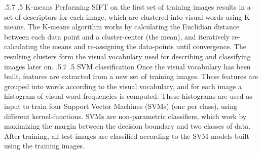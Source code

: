 \documentclass[12pt,a4paper]{amsart}
\makeatletter
\def\subsection{\@startsection{subsection}{2}{\z@}%
  {.5\linespacing\@plus.7\linespacing}%
  {.5\linespacing}%
  {\small\normalfont}}
\makeatother
\begin{document}
\subsection{K-means}
Performing SIFT on the first set of training images results in a set of descriptors for each image, which are clustered into visual words using K-means. The K-means algorithm works by calculating the Euclidian distance between each data point and a cluster-center (the mean), and iteratively re-calculating the means and re-assigning the data-points until convergence. The resulting clusters form the visual vocabulary used for describing and classifying images later on. 
\subsection{SVM classification}
Once the visual vocabulary has been built, features are extracted from a new set of training images. These features are grouped into words according to the visual vocabulary, and for each image a histogram of visual word frequencies is computed.
These histograms are used as input to train four Support Vector Machines (SVMs) (one per class), using different kernel-functions. SVMs are non-parametric classifiers, which work by maximizing the margin between the decision boundary and two classes of data.
After training, all test images are classified according to the SVM-models built using the training images. 
\end{document}
